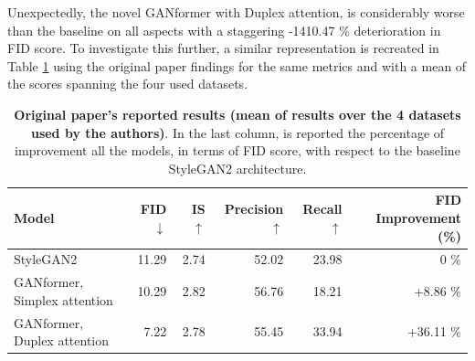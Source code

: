 \documentclass{article}
\begin{document}
	Unexpectedly, the novel GANformer with Duplex attention, is considerably worse than the baseline 
	on all aspects with a staggering -1410.47 \% deterioration in FID score.
	To investigate this further, a similar representation is recreated in Table \ref{tab:orig-results} using 
	the original paper findings for the same metrics and with a mean of the scores spanning the four 
	used datasets.
	\begin{table}[htb]
    	\centering
        \caption{\textbf{Original paper's reported results (mean of results over the 4 datasets used by the 
        authors)}. In the last column, is reported the percentage of improvement all the models, in terms 
        of FID score, with respect to the baseline StyleGAN2 architecture.}
        \label{tab:orig-results}
        \vspace{3mm}
        \small
        \begin{tabular}{l|rrrrr}
	        \toprule
	        Model           & FID  $\downarrow$ & IS $\uparrow$& Precision $\uparrow$ & Recall 
	        $\uparrow$& {FID Improvement (\%)}\\ 
	        \midrule
	        StyleGAN2                    & 11.29 & 2.74 & 52.02      & 23.98 & 0 \% \\ 
	        {GANformer, Simplex attention} & 10.29 & 2.82   & 56.76     & 18.21  & 
	        +8.86 \% \\ 
	        {GANformer, Duplex attention}  & 7.22   & 2.78 & 55.45     & 33.94 & +36.11 \%
	        \\ 
	        \bottomrule
        \end{tabular}
        \end{table}
	
\end{document}
